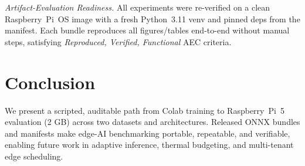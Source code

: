 \documentclass{article}
\begin{document}
\noindent\textit{Artifact-Evaluation Readiness.}
All experiments were re-verified on a clean Raspberry~Pi~OS image with a fresh Python~3.11 venv and pinned deps from the manifest.  
Each bundle reproduces all figures/tables end-to-end without manual steps, satisfying \emph{Reproduced, Verified, Functional} AEC criteria.

\section{Conclusion}
We present a scripted, auditable path from Colab training to Raspberry~Pi~5 evaluation (2 GB) across two datasets and architectures.  
Released ONNX bundles and manifests make edge-AI benchmarking portable, repeatable, and verifiable, enabling future work in adaptive inference, thermal budgeting, and multi-tenant edge scheduling.
\end{document}
